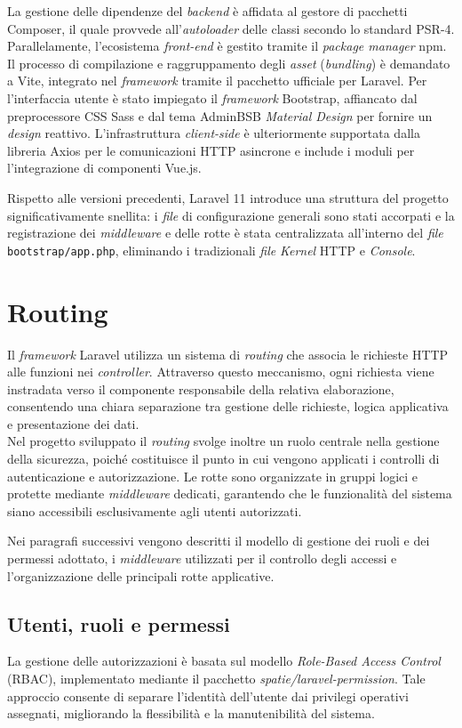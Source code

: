La gestione delle dipendenze del \textit{backend} è affidata al gestore di pacchetti Composer, il quale provvede all'\textit{autoloader} delle classi secondo lo standard PSR-4. Parallelamente, l'ecosistema \textit{front-end} è gestito tramite il \textit{package manager} npm. Il processo di compilazione e raggruppamento degli \textit{asset} (\textit{bundling}) è demandato a Vite, integrato nel \textit{framework} tramite il pacchetto ufficiale per Laravel. Per l'interfaccia utente è stato impiegato il \textit{framework} Bootstrap, affiancato dal preprocessore CSS Sass e dal tema AdminBSB \textit{Material Design} per fornire un \textit{design} reattivo. L'infrastruttura \textit{client-side} è ulteriormente supportata dalla libreria Axios per le comunicazioni HTTP asincrone e include i moduli per l'integrazione di componenti Vue.js.

Rispetto alle versioni precedenti, Laravel 11 introduce una struttura del progetto significativamente snellita: i \textit{file} di configurazione generali sono stati accorpati e la registrazione dei \textit{middleware} e delle rotte è stata centralizzata all'interno del \textit{file} \texttt{bootstrap/app.php}, eliminando i tradizionali \textit{file} \textit{Kernel} HTTP e \textit{Console}.
\section{Routing}
Il \textit{framework} Laravel utilizza un sistema di \textit{routing} che associa le richieste HTTP alle funzioni nei \textit{controller}. Attraverso questo meccanismo, ogni richiesta viene instradata verso il componente responsabile della relativa elaborazione, consentendo una chiara separazione tra gestione delle richieste, logica applicativa e presentazione dei dati.\\
Nel progetto sviluppato il \textit{routing} svolge inoltre un ruolo centrale nella gestione della sicurezza, poiché costituisce il punto in cui vengono applicati i controlli di autenticazione e autorizzazione. Le rotte sono organizzate in gruppi logici e protette mediante \textit{middleware} dedicati, garantendo che le funzionalità del sistema siano accessibili esclusivamente agli utenti autorizzati.

Nei paragrafi successivi vengono descritti il modello di gestione dei ruoli e dei permessi adottato, i \textit{middleware} utilizzati per il controllo degli accessi e l'organizzazione delle principali rotte applicative.
\subsection{Utenti, ruoli e permessi}
La gestione delle autorizzazioni è basata sul modello \textit{Role-Based Access Control} (RBAC), implementato mediante il pacchetto \textit{spatie/laravel-permission}. Tale approccio consente di separare l'identità dell'utente dai privilegi operativi assegnati, migliorando la flessibilità e la manutenibilità del sistema.

